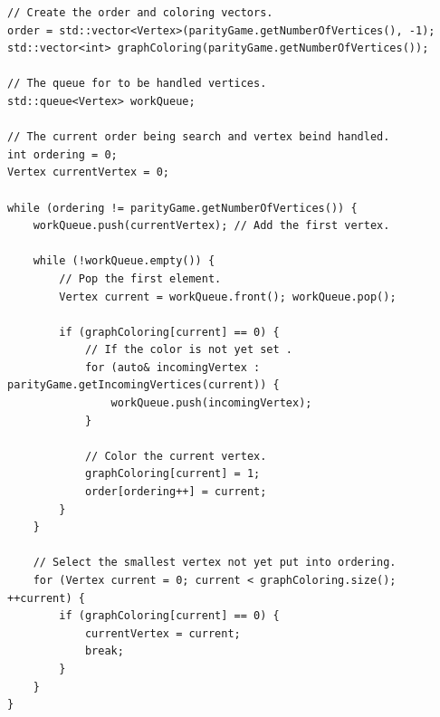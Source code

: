 \documentclass[10pt,a4paper]{article}
\begin{document}
\begin{verbatim}
// Create the order and coloring vectors.
order = std::vector<Vertex>(parityGame.getNumberOfVertices(), -1);
std::vector<int> graphColoring(parityGame.getNumberOfVertices());

// The queue for to be handled vertices.
std::queue<Vertex> workQueue;

// The current order being search and vertex beind handled.
int ordering = 0;
Vertex currentVertex = 0;

while (ordering != parityGame.getNumberOfVertices()) {
    workQueue.push(currentVertex); // Add the first vertex.

    while (!workQueue.empty()) {
        // Pop the first element.
        Vertex current = workQueue.front(); workQueue.pop();

        if (graphColoring[current] == 0) {
            // If the color is not yet set .
            for (auto& incomingVertex : parityGame.getIncomingVertices(current)) {
                workQueue.push(incomingVertex);
            }

            // Color the current vertex.
            graphColoring[current] = 1;
            order[ordering++] = current;
        }
    }

    // Select the smallest vertex not yet put into ordering.
    for (Vertex current = 0; current < graphColoring.size(); ++current) {
        if (graphColoring[current] == 0) {
            currentVertex = current;
            break;
        }
    }
}
\end{verbatim}
\end{document}
